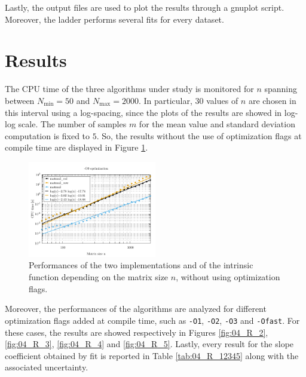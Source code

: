 \documentclass[pra, onecolumn, notitlepage, floats, 11pt]{revtex4-1}
\newcommand{\code}[2][black]{\color{#1}\texttt{#2}}
\begin{document}
Lastly, the output files are used to plot the results through a gnuplot script. Moreover, the ladder performs several fits for every dataset.





\section{Results}
The CPU time of the three algorithms under study is monitored for \( n \) spanning between \( N_{\mathrm{min}} = 50 \) and \( N_{\mathrm{max}} = 2000 \). In particular, \( 30 \) values of \( n \) are chosen in this interval using a log-spacing, since the plots of the results are showed in log-log scale. The number of samples \( m \) for the mean value and standard deviation computation is fixed to \( 5 \). So, the results without the use of optimization flags at compile time are displayed in Figure \ref{fig:04_R_1}.

\begin{figure}[!h]
	\centering
	\includegraphics[width=0.5\textwidth]{images/flag-O0.pdf}
	\caption{\label{fig:04_R_1} Performances of the two implementations and of the intrinsic function depending on the matrix size \( n \), without using optimization flags.}
\end{figure}

Moreover, the performances of the algorithms are analyzed for different optimization flags added at compile time, such as \code{-O1}, \code{-O2}, \code{-O3} and \code{-Ofast}. For these cases, the results are showed respectively in Figures \ref{fig:04_R_2}, \ref{fig:04_R_3}, \ref{fig:04_R_4} and \ref{fig:04_R_5}.
Lastly, every result for the slope coefficient obtained by fit is reported in Table \ref{tab:04_R_12345} along with the associated uncertainty.
\end{document}
